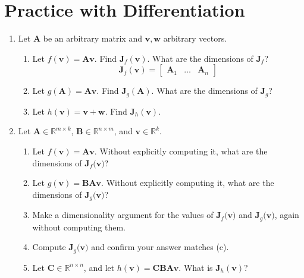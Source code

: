 \documentclass{article}
\begin{document}
\section{Practice with Differentiation}
\begin{enumerate}[label=\arabic*.]
\item Let $\mathbf{A}$ be an arbitrary matrix and $\mathbf{v}, \mathbf{w}$ arbitrary vectors.
	\begin{enumerate}[label=(\alph*)]
	\item Let $f(\mathbf{v}) = \mathbf{Av}$. Find $\mathbf{J}_{f}(\mathbf{v})$. What are the dimensions of $\mathbf{J}_f$? \\
	{\color{blue} $$\mathbf{J}_f(\mathbf{v}) = \begin{bmatrix} \mathbf{A}_1 & \hdots & \mathbf{A}_n \end{bmatrix}$$}
	\item Let $g(\mathbf{A}) = \mathbf{Av}$. Find $\mathbf{J}_{g}(\mathbf{A})$. What are the dimensions of $\mathbf{J}_g$?
	\item Let $h(\mathbf{v}) = \mathbf{v + w}$. Find $\mathbf{J}_{h}(\mathbf{v})$.
	\end{enumerate}
\item Let $\mathbf{A} \in \mathbb{R}^{m \times k}$, $\mathbf{B} \in \mathbb{R}^{n \times m}$, and $\mathbf{v} \in \mathbb{R}^k$.
	\begin{enumerate}[label=(\alph*)]
	\item Let $f(\mathbf{v}) = \mathbf{Av}$. Without explicitly computing it, what are the dimensions of $\mathbf{J}_f(\mathbf{v)}$?
	\item Let $g(\mathbf{v}) = \mathbf{BAv}$. Without explicitly computing it, what are the dimensions of $\mathbf{J}_g(\mathbf{v)}$?
	\item Make a dimensionality argument for the values of $\mathbf{J}_f(\mathbf{v)}$ and $\mathbf{J}_g(\mathbf{v)}$, again without computing them.
	\item Compute $\mathbf{J}_g(\mathbf{v)}$ and confirm your answer matches (c).
	\item Let $\mathbf{C} \in \mathbb{R}^{n \times n}$, and let $h(\mathbf{v}) = \mathbf{CBAv}$. What is $\mathbf{J}_h(\mathbf{v})$?
	\end{enumerate}
\end{enumerate}
\end{document}
